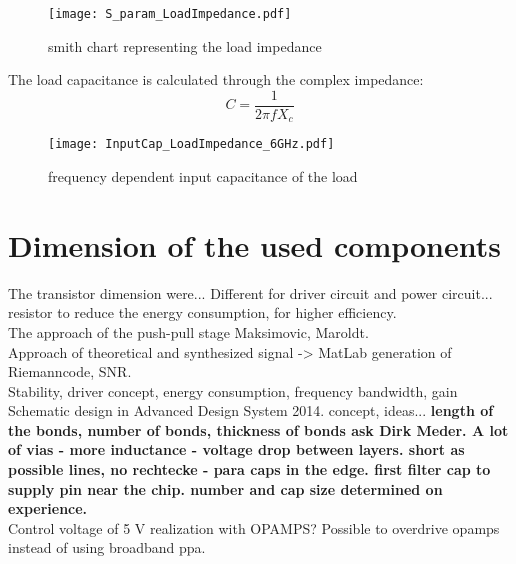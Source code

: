  \begin{figure}[ht]
	\centering
  \texttt{[image: S\_param\_LoadImpedance.pdf]}
	\caption{smith chart representing the load impedance}
	\label{fig:smith_load_impedance}
\end{figure}

The load capacitance is calculated through the complex impedance:
\begin{equation}
C = \frac{1}{2 \pi f X_c}
\end{equation}

 \begin{figure}[ht]
	\centering
  \texttt{[image: InputCap\_LoadImpedance\_6GHz.pdf]}
	\caption{frequency dependent input capacitance of the load}
	\label{fig:smith_load_impedance_inC}
\end{figure}
\section{Dimension of the used components}
The transistor dimension were... Different for driver circuit and power circuit... resistor to reduce the energy  consumption, for higher efficiency. \\ The
approach of the push-pull stage Maksimovic, Maroldt.\\
Approach of theoretical and synthesized signal -> MatLab generation of Riemanncode, SNR.\\ Stability, driver concept, energy consumption, frequency bandwidth, gain
Schematic design in Advanced Design System 2014. concept, ideas... 
\textbf{length of the bonds, number of bonds, thickness of bonds ask Dirk Meder. A lot of vias - more inductance - voltage drop between layers. short as possible lines, no rechtecke - para caps in the edge. first filter cap to supply pin near the chip. number and cap size determined on experience. }\\
Control voltage of 5 V realization with OPAMPS? Possible to overdrive opamps instead of using broadband ppa. 


